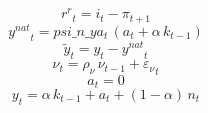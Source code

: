 \documentclass[10pt,a4paper]{article}
\begin{document}
\begin{dmath}
{r^r}_{t}={i}_{t}-{\pi}_{t+1}
\end{dmath}
\begin{dmath}
{y^{nat}}_{t}=psi\_n\_ya_{t}\, \left({a}_{t}+{\alpha}\, {k}_{t-1}\right)
\end{dmath}
\begin{dmath}
{\tilde y}_{t}={y}_{t}-{y^{nat}}_{t}
\end{dmath}
\begin{dmath}
{\nu}_{t}={\rho_{\nu}}\, {\nu}_{t-1}+{\varepsilon_\nu}_{t}
\end{dmath}
\begin{dmath}
{a}_{t}=0
\end{dmath}
\begin{dmath}
{y}_{t}={\alpha}\, {k}_{t-1}+{a}_{t}+\left(1-{\alpha}\right)\, {n}_{t}
\end{dmath}
\end{document}
